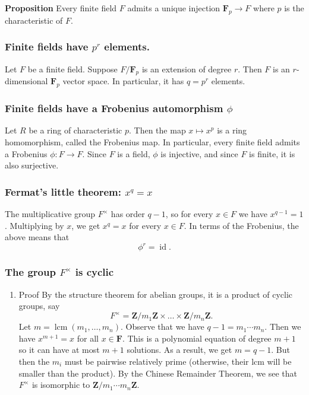 \documentclass[11pt]{article}
\begin{document}
\textbf{\textbf{Proposition}} Every finite field \(F\) admits a unique injection \(\mathbf{F}_p \to F\) where \(p\) is the characteristic of \(F\).
\subsubsection{Finite fields have \(p^r\) elements.}
\label{sec:orga515112}
Let \(F\) be a finite field.
Suppose \(F / \mathbf{F}_p\) is an extension of degree \(r\).
Then \(F\) is an \(r\)-dimensional \(\mathbf{F}_p\) vector space.
In particular, it has \(q = p^r\) elements.
\subsubsection{Finite fields have a Frobenius automorphism \(\phi\)}
\label{sec:org4d52f3a}
Let \(R\) be a ring of characteristic \(p\).
Then the map \(x \mapsto x^p\) is a ring homomorphism, called the Frobenius map.
In particular, every finite field admits a Frobenius \(\phi \colon F \to F\).
Since \(F\) is a field, \(\phi\) is injective, and since \(F\) is finite, it is also surjective.
\subsubsection{Fermat's little theorem: \(x^q = x\)}
\label{sec:orge09cfe3}
The multiplicative group \(F^{\times}\) has order \(q-1\), so for every \(x \in F\) we have \(x^{q-1} = 1\).
Multiplying by \(x\), we get \(x^q = x\) for every \(x \in F\).
In terms of the Frobenius, the above means that 
\[ \phi^r = \operatorname{id}.\]
\subsubsection{The group \(F^{\times}\) is cyclic}
\label{sec:org662ab3a}
\begin{enumerate}
\item Proof
\label{sec:org37a15b8}
By the structure theorem for abelian groups, it is a product of cyclic groups, say
\[ F^{\times} = \mathbf{Z}/m_1 \mathbf{Z} \times \dots \times \mathbf{Z}/ m_n \mathbf{Z}.\]
Let \(m = \operatorname{lcm}(m_1, \dots, m_n)\).
Observe that we have \(q - 1 = m_1 \cdots m_{n}.\)
Then we have \(x^{m+1} = x\) for all \(x \in \mathbf{F}\).
This is a polynomial equation of degree \(m+1\) so it can have at most \(m+1\) solutions.
As a result, we get \(m = q-1\).
But then the \(m_i\) must be pairwise relatively prime (otherwise, their lcm will be smaller than the product).
By the Chinese Remainder Theorem, we see that \(F^{\times}\) is isomorphic to \(\mathbf{Z} / m_1\cdots m_n \mathbf{Z}\).
\end{enumerate}
\end{document}
